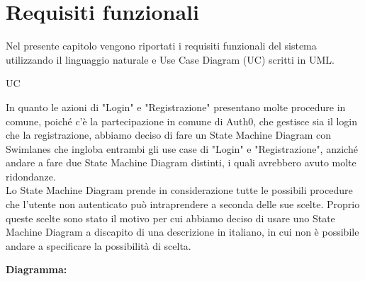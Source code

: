 \section{Requisiti funzionali}
\label{secD2:RequisitiFunzionali}

Nel presente capitolo vengono riportati i requisiti funzionali del sistema utilizzando il linguaggio naturale e Use Case Diagram (UC) scritti in UML.

\begin{listaPersonale}{UC}

    \begin{center}
        
    \end{center}
    In quanto le azioni di "Login" e "Registrazione" presentano molte procedure in comune, poiché c'è la partecipazione in comune di Auth0, che gestisce sia il login che la registrazione, abbiamo deciso di fare un State Machine Diagram con Swimlanes che ingloba entrambi gli use case di "Login" e "Registrazione", anziché andare a fare due State Machine Diagram distinti, i quali avrebbero avuto molte ridondanze. \\ Lo State Machine Diagram prende in considerazione tutte le possibili procedure che l'utente non autenticato  può intraprendere a seconda delle sue scelte. Proprio queste scelte sono stato il motivo per cui abbiamo deciso di usare uno State Machine Diagram a discapito di una descrizione in italiano, in cui non è possibile andare a specificare la possibilità di scelta.

    \textbf{Diagramma:}
    \begin{center}
        
    \end{center}



\end{listaPersonale}
